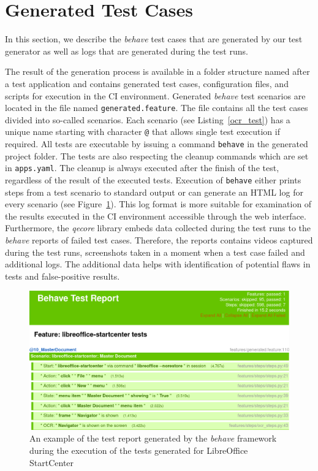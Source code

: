 \section{Generated Test Cases}
In this section, we describe the \textit{behave} test cases that are generated by our test generator as well as logs that are generated during the test runs. 

The result of the generation process is available in a folder structure named after a test application and contains generated test cases, configuration files, and scripts for execution in the CI environment. 
Generated \textit{behave} test scenarios are located in the file named \texttt{generated.feature}. The file contains all the test cases divided into so-called scenarios. Each scenario (see Listing~\ref{ocr_test}) has a unique name starting with character \texttt{@} that allows single test execution if required. All tests are executable by issuing a command \texttt{behave} in the generated project folder. The tests are also respecting the cleanup commands which are set in \texttt{apps.yaml}. The cleanup is always executed after the finish of the test, regardless of the result of the executed tests. Execution of \texttt{behave} either prints steps from a test scenario to standard output or can generate an HTML log for every scenario (see Figure~\ref{lo_report_html}). This log format is more suitable for examination of the results executed in the CI environment accessible through the web interface. Furthermore, the \textit{qecore} library embeds data collected during the test runs to the \textit{behave} reports of failed test cases. Therefore, the reports contains videos captured during the test runs, screenshots taken in a moment when a test case failed and additional logs. The additional data helps with identification of potential flaws in tests and false-positive results.

\begin{figure}[H]
	\centering
	\includegraphics[width=1\textwidth,clip]{obrazky-figures/libreoffice-report.png}
	\caption{An example of the test report generated by the \textit{behave} framework during the execution of the tests generated for LibreOffice StartCenter}
	\label{lo_report_html}
\end{figure}

